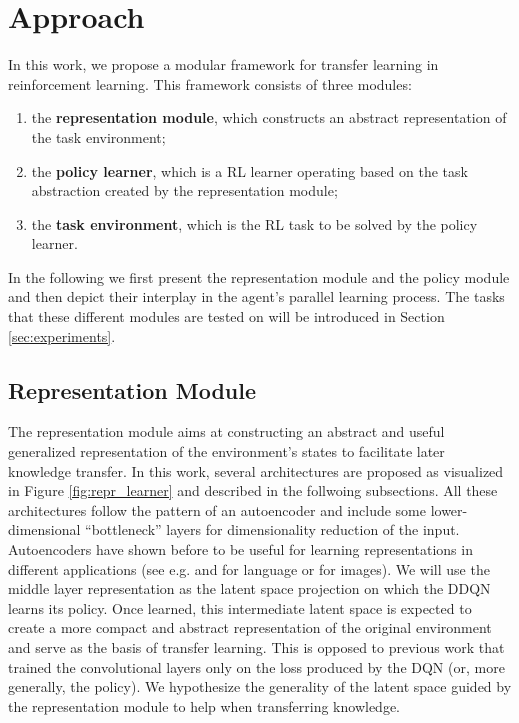 
\section{Approach}
\label{sec:approach}
In this work, we propose a modular framework for transfer learning in reinforcement learning. 
This framework consists of three modules: 
\begin{enumerate}[i]
    \item the \textbf{representation module}, which constructs an abstract representation of the task environment;
    \item the \textbf{policy learner}, which is a RL learner operating based on the task abstraction created by the representation module;
    \item the \textbf{task environment}, which is the RL task to be solved by the policy learner.
\end{enumerate}
In the following we first present the representation module and the policy module and then depict their interplay in the agent's parallel learning process. The tasks that these different modules are tested on will be introduced in Section \ref{sec:experiments}.

\subsection{Representation Module}
The representation module aims at constructing an abstract and useful generalized representation of the environment's states to facilitate later knowledge transfer. In this work, several architectures are proposed as visualized in Figure \ref{fig:repr_learner} and described in the follwoing subsections. All these architectures follow the pattern of an autoencoder \citep{ballard1987modular} and include some lower-dimensional ``bottleneck'' layers for dimensionality reduction of the input. Autoencoders have shown before to be useful for learning representations \citep{bengio2012deep} in different applications (see e.g. \citet{ap2014autoencoder} and \citet{silberer2014learning} for language or \citet{wang2013learning} for images). We will use the middle layer representation as the latent space projection on which the DDQN learns its policy.
Once learned, this intermediate latent space is expected to create a more compact and abstract representation of the original environment and serve as the basis of transfer learning. This is opposed to previous work that trained the convolutional layers only on the loss produced by the DQN (or, more generally, the policy). We hypothesize the generality of the latent space guided by the representation module to help when transferring knowledge. 

